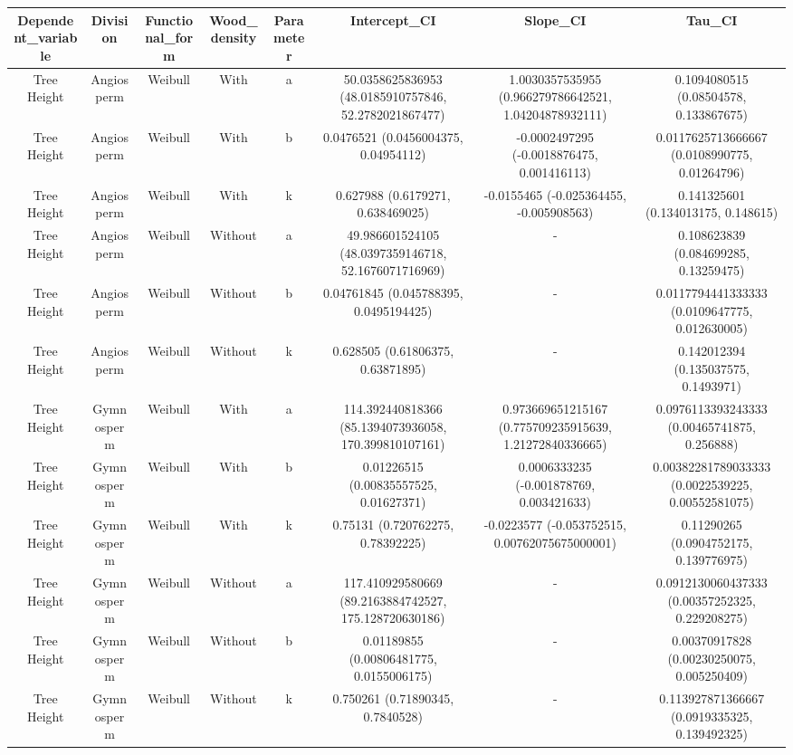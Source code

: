 \documentclass[
  12pt,
  letterpaper,
  DIV=11,
  numbers=noendperiod]{scrartcl}
\begin{document}
\begin{longtable*}[t]{cccccccc}
\toprule
Dependent\_variable & Division & Functional\_form & Wood\_density & Parameter & Intercept\_CI & Slope\_CI & Tau\_CI\\
\midrule
Tree Height & Angiosperm & Weibull & With & a & 50.0358625836953 (48.0185910757846, 52.2782021867477) & 1.0030357535955 (0.966279786642521, 1.04204878932111) & 0.1094080515 (0.08504578, 0.133867675)\\
Tree Height & Angiosperm & Weibull & With & b & 0.0476521 (0.0456004375, 0.04954112) & -0.0002497295 (-0.0018876475, 0.001416113) & 0.0117625713666667 (0.0108990775, 0.01264796)\\
Tree Height & Angiosperm & Weibull & With & k & 0.627988 (0.6179271, 0.638469025) & -0.0155465 (-0.025364455, -0.005908563) & 0.141325601 (0.134013175, 0.148615)\\
Tree Height & Angiosperm & Weibull & Without & a & 49.986601524105 (48.0397359146718, 52.1676071716969) & - & 0.108623839 (0.084699285, 0.13259475)\\
Tree Height & Angiosperm & Weibull & Without & b & 0.04761845 (0.045788395, 0.0495194425) & - & 0.0117794441333333 (0.0109647775, 0.012630005)\\
\addlinespace
Tree Height & Angiosperm & Weibull & Without & k & 0.628505 (0.61806375, 0.63871895) & - & 0.142012394 (0.135037575, 0.1493971)\\
Tree Height & Gymnosperm & Weibull & With & a & 114.392440818366 (85.1394073936058, 170.399810107161) & 0.973669651215167 (0.775709235915639, 1.21272840336665) & 0.0976113393243333 (0.00465741875, 0.256888)\\
Tree Height & Gymnosperm & Weibull & With & b & 0.01226515 (0.00835557525, 0.01627371) & 0.0006333235 (-0.001878769, 0.003421633) & 0.00382281789033333 (0.0022539225, 0.00552581075)\\
Tree Height & Gymnosperm & Weibull & With & k & 0.75131 (0.720762275, 0.78392225) & -0.0223577 (-0.053752515, 0.00762075675000001) & 0.11290265 (0.0904752175, 0.139776975)\\
Tree Height & Gymnosperm & Weibull & Without & a & 117.410929580669 (89.2163884742527, 175.128720630186) & - & 0.0912130060437333 (0.00357252325, 0.229208275)\\
\addlinespace
Tree Height & Gymnosperm & Weibull & Without & b & 0.01189855 (0.00806481775, 0.0155006175) & - & 0.00370917828 (0.00230250075, 0.005250409)\\
Tree Height & Gymnosperm & Weibull & Without & k & 0.750261 (0.71890345, 0.7840528) & - & 0.113927871366667 (0.0919335325, 0.139492325)\\

\end{longtable*}
\end{document}
